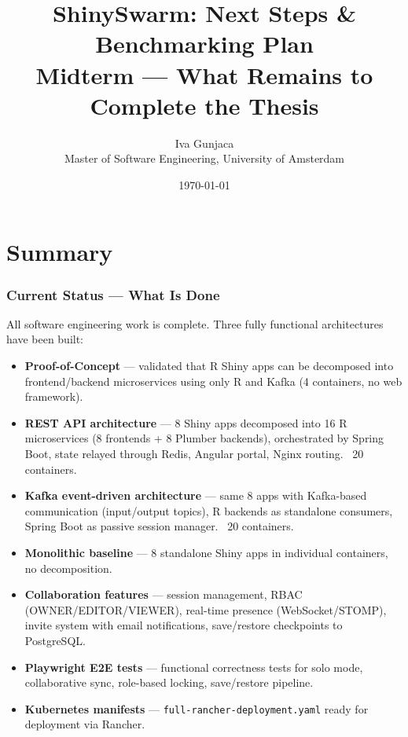 \documentclass[12pt,a4paper]{article}
\title{\textbf{ShinySwarm: Next Steps \& Benchmarking Plan}\\[0.5em]
\large Midterm --- What Remains to Complete the Thesis}
\author{Iva Gunjaca\\
Master of Software Engineering, University of Amsterdam}
\date{\today}
\begin{document}
\maketitle
\tableofcontents
\newpage

\part{Summary}

\section{Current Status --- What Is Done}

All software engineering work is complete. Three fully functional architectures have been built:

\begin{itemize}[nosep]
  \item \textbf{Proof-of-Concept} --- validated that R Shiny apps can be decomposed into frontend/backend microservices using only R and Kafka (4 containers, no web framework).
  \item \textbf{REST API architecture} --- 8 Shiny apps decomposed into 16 R microservices (8 frontends + 8 Plumber backends), orchestrated by Spring Boot, state relayed through Redis, Angular portal, Nginx routing. ~20 containers.
  \item \textbf{Kafka event-driven architecture} --- same 8 apps with Kafka-based communication (input/output topics), R backends as standalone consumers, Spring Boot as passive session manager. ~20 containers.
  \item \textbf{Monolithic baseline} --- 8 standalone Shiny apps in individual containers, no decomposition.
  \item \textbf{Collaboration features} --- session management, RBAC (OWNER/EDITOR/VIEWER), real-time presence (WebSocket/STOMP), invite system with email notifications, save/restore checkpoints to PostgreSQL.
  \item \textbf{Playwright E2E tests} --- functional correctness tests for solo mode, collaborative sync, role-based locking, save/restore pipeline.
  \item \textbf{Kubernetes manifests} --- \texttt{full-rancher-deployment.yaml} ready for deployment via Rancher.
\end{itemize}
\end{document}
